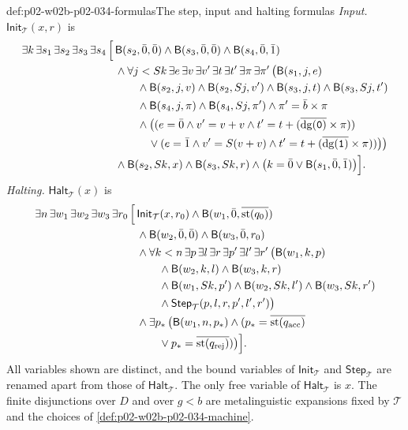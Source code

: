 \begin{hbdefinition}{def:p02-w02b-p02-034-formulas}{The step, input and halting formulas}
\emph{Input.}  \(\mathsf{Init}_{\mathcal T}(x,r)\) is
\[
\begin{aligned}
 \exists k\,\exists s_1\,\exists s_2\,\exists s_3\,\exists s_4\,\Bigl[\,
 &\mathsf B(s_2,\bar0,\bar0)\land\mathsf B(s_3,\bar0,\bar0)\land\mathsf B(s_4,\bar0,\bar1)\\
 &\land\forall j<Sk\,\exists e\,\exists v\,\exists v'\,\exists t\,\exists t'\,\exists\pi\,\exists\pi'\,
 \bigl(\mathsf B(s_1,j,e)\\
 &\qquad\land\mathsf B(s_2,j,v)\land\mathsf B(s_2,Sj,v')\land
   \mathsf B(s_3,j,t)\land\mathsf B(s_3,Sj,t')\\
 &\qquad\land\mathsf B(s_4,j,\pi)\land\mathsf B(s_4,Sj,\pi')\land\pi'=\bar b\times\pi\\
 &\qquad\land\bigl((e=\bar0\land v'=v+v\land t'=t+(\overline{\operatorname{dg}(\mathtt 0)}\times\pi))\\
 &\qquad\quad\lor(e=\bar1\land v'=S(v+v)\land t'=t+(\overline{\operatorname{dg}(\mathtt 1)}\times\pi))\bigr)\bigr)\\
 &\land\mathsf B(s_2,Sk,x)\land\mathsf B(s_3,Sk,r)\land\bigl(k=\bar0\lor\mathsf B(s_1,\bar0,\bar1)\bigr)\Bigr].
\end{aligned}
\]
\emph{Halting.}  \(\mathsf{Halt}_{\mathcal T}(x)\) is
\[
\begin{aligned}
 \exists n\,\exists w_1\,\exists w_2\,\exists w_3\,\exists r_0\,\Bigl[\,
 &\mathsf{Init}_{\mathcal T}(x,r_0)\land\mathsf B(w_1,\bar0,\overline{\operatorname{st}(q_0)})\\
 &\land\mathsf B(w_2,\bar0,\bar0)\land\mathsf B(w_3,\bar0,r_0)\\
 &\land\forall k<n\,\exists p\,\exists l\,\exists r\,\exists p'\,\exists l'\,\exists r'\,
   \bigl(\mathsf B(w_1,k,p)\\
 &\qquad\land\mathsf B(w_2,k,l)\land\mathsf B(w_3,k,r)\\
 &\qquad\land\mathsf B(w_1,Sk,p')\land\mathsf B(w_2,Sk,l')\land\mathsf B(w_3,Sk,r')\\
 &\qquad\land\mathsf{Step}_{\mathcal T}(p,l,r,p',l',r')\bigr)\\
 &\land\exists p_\ast\,\bigl(\mathsf B(w_1,n,p_\ast)
   \land(p_\ast=\overline{\operatorname{st}(q_{\mathrm{acc}})}\\
 &\qquad\lor p_\ast=\overline{\operatorname{st}(q_{\mathrm{rej}})})\bigr)\Bigr].
\end{aligned}
\]
All variables shown are distinct, and the bound variables of
\(\mathsf{Init}_{\mathcal T}\) and \(\mathsf{Step}_{\mathcal T}\) are renamed
apart from those of \(\mathsf{Halt}_{\mathcal T}\).  The only free variable
of \(\mathsf{Halt}_{\mathcal T}\) is \(x\).  The finite disjunctions over
\(D\) and over \(g<b\) are metalinguistic expansions fixed by
\(\mathcal T\) and the choices of \cref{def:p02-w02b-p02-034-machine}.
\end{hbdefinition}

